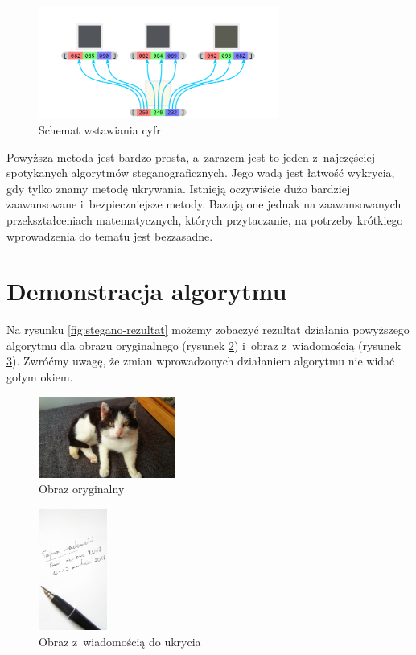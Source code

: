 \documentclass[12pt,a4paper]{article}
\begin{document}
    \begin{figure}[!h]
        \centering
        \includegraphics[width=0.7\textwidth]{pieces/wstawianie-pikseli}
        \caption{Schemat wstawiania cyfr} \label{fig:wstawianie-pikseli}
    \end{figure}

    Powyższa metoda jest bardzo prosta, a~zarazem jest to jeden z~najczęściej spotykanych algorytmów steganograficznych. Jego wadą jest łatwość wykrycia, gdy tylko znamy metodę ukrywania. Istnieją oczywiście dużo bardziej zaawansowane i~bezpieczniejsze metody. Bazują one jednak na zaawansowanych przekształceniach matematycznych, których przytaczanie, na potrzeby krótkiego wprowadzenia do tematu jest bezzasadne.

\section{Demonstracja algorytmu}
    Na rysunku \ref{fig:stegano-rezultat} możemy zobaczyć rezultat działania powyższego algorytmu dla obrazu oryginalnego (rysunek \ref{fig:stegano-zrodlo}) i~obraz z~wiadomością (rysunek \ref{fig:stegano-wiadomosc}). Zwróćmy uwagę, że zmian wprowadzonych działaniem algorytmu nie widać gołym okiem.

    \begin{figure}[!h]
        \centering
        \includegraphics[width=0.4\textwidth]{pieces/kot}
        \caption{Obraz oryginalny} \label{fig:stegano-zrodlo}
    \end{figure}

    \begin{figure}[!h]
        \centering
        \includegraphics[width=0.2\textwidth]{pieces/wiadomosc}
        \caption{Obraz z~wiadomością do ukrycia} \label{fig:stegano-wiadomosc}
    \end{figure}
\end{document}
